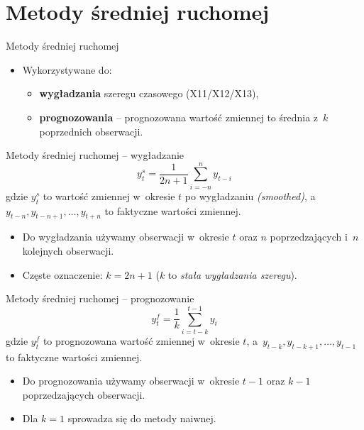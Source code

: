 \documentclass[11pt,usenames,dvipsnames,aspectratio=169]{beamer}
\begin{document}
\section{Metody średniej ruchomej}

\begin{frame}{Metody średniej ruchomej}
\begin{itemize}
    \item Wykorzystywane do:
    \begin{itemize}
        \item \textbf{wygładzania} szeregu czasowego (X11/X12/X13),
        \item \textbf{prognozowania} -- prognozowana wartość zmiennej to średnia z~$k$ poprzednich obserwacji.
    \end{itemize}
\end{itemize}
\end{frame}

\begin{frame}{Metody średniej ruchomej -- wygładzanie}
\[
y_{t}^{s}=\frac{1}{2n+1}\sum_{i=-n}^{n}y_{t-i}
\]
gdzie $y_{t}^{s}$ to wartość zmiennej w~okresie $t$ po wygładzaniu \emph{(smoothed)}, a~$y_{t-n},y_{t-n+1},\ldots,y_{t+n}$ to faktyczne wartości zmiennej.
\begin{itemize}
    \item Do wygładzania używamy obserwacji w~okresie $t$ oraz $n$ poprzedzających i~$n$ kolejnych obserwacji.
    \item Częste oznaczenie: $k=2n+1$ ($k$ to \emph{stała wygładzania szeregu}).
\end{itemize}
\end{frame}

\begin{frame}{Metody średniej ruchomej -- prognozowanie}
\[
y_{t}^{f}=\frac{1}{k}\sum_{i=t-k}^{t-1}y_{i}
\]
gdzie $y_{t}^{f}$ to prognozowana wartość zmiennej w~okresie $t$, a~$y_{t-k},y_{t-k+1},\ldots,y_{t-1}$ to faktyczne wartości zmiennej.
\begin{itemize}
    \item Do prognozowania używamy obserwacji w~okresie $t-1$ oraz $k-1$ poprzedzających obserwacji.
    \item Dla $k=1$ sprowadza się do metody naiwnej.
\end{itemize}
\end{frame}
\end{document}
